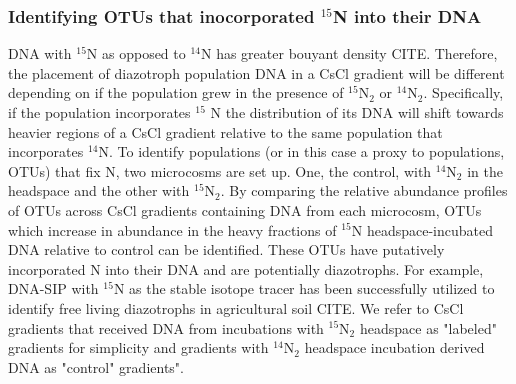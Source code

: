 \subsubsection{Identifying OTUs that inocorporated $^{15}$N into their DNA}
DNA with $^{15}$N as opposed to $^{14}$N has greater bouyant density CITE. Therefore, the placement of diazotroph population DNA in a CsCl gradient will be different depending on if the population grew in the presence of $^{15}$N$_{2}$ or $^{14}$N$_{2}$. Specifically, if the population incorporates $^{15}$ N the distribution of its DNA will shift towards heavier regions of a CsCl gradient relative to the same population that incorporates $^{14}$N. To identify populations (or in this case a proxy to populations, OTUs) that fix N, two microcosms are set up. One, the control, with $^{14}$N$_{2}$ in the headspace and the other with $^{15}$N$_{2}$. By comparing the relative abundance profiles of OTUs across CsCl gradients containing DNA from each microcosm, OTUs which increase in abundance in the heavy fractions of $^{15}$N headspace-incubated DNA relative to control can be identified. These OTUs have putatively incorporated N into their DNA and are potentially diazotrophs. For example, DNA-SIP with $^{15}$N as the stable isotope tracer has been successfully utilized to identify free living diazotrophs in agricultural soil CITE. We refer to CsCl gradients that received DNA from incubations with $^{15}$N$_{2}$ headspace as "labeled" gradients for simplicity and gradients with $^{14}$N$_{2}$ headspace incubation derived DNA as "control" gradients".

